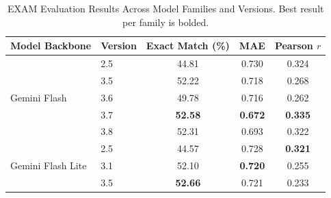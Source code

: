 \begin{table}[htbp]
\centering
\caption{EXAM Evaluation Results Across Model Families and Versions. Best result per family is bolded.}
\label{tab:exam_results}
\begin{tabular}{@{}llccc@{}}
\toprule
\textbf{Model Backbone} & \textbf{Version} & \textbf{Exact Match (\%)} & \textbf{MAE} & \textbf{Pearson $r$} \\ \midrule
\multirow{5}{*}{Gemini Flash} 
 & 2.5 & 44.81 & 0.730 & 0.324 \\
 & 3.5 & 52.22 & 0.718 & 0.268 \\
 & 3.6 & 49.78 & 0.716 & 0.262 \\
 & 3.7 & \textbf{52.58} & \textbf{0.672} & \textbf{0.335} \\
 & 3.8 & 52.31 & 0.693 & 0.322 \\ \midrule
\multirow{3}{*}{Gemini Flash Lite} 
 & 2.5 & 44.57 & 0.728 & \textbf{0.321} \\
 & 3.1 & 52.10 & \textbf{0.720} & 0.255 \\
 & 3.5 & \textbf{52.66} & 0.721 & 0.233 \\ \bottomrule
\end{tabular}
\end{table}
